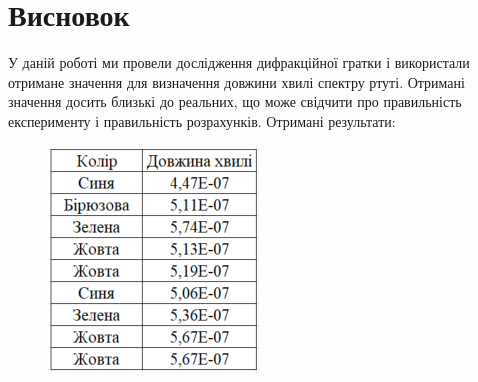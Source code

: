 
\section{Висновок}
\setlength{\parindent}{4em}
\qquad У даній роботі ми провели дослідження дифракційної гратки і використали отримане значення для визначення довжини хвилі спектру ртуті. Отримані значення досить близькі до реальних, що може свідчити про правильність експерименту і правильність розрахунків. Отримані результати:
\begin{figure}[ht]

\centering

\includegraphics[width=0.6\linewidth]{Pics/tabl5.png}

\label{table1}

\end{figure}
